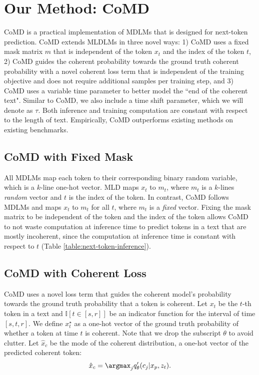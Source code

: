 \documentclass{article} %
\begin{document}
\section{Our Method: CoMD}

CoMD is a practical implementation of MDLMs that is designed for next-token prediction. CoMD extends MLDLMs in three novel ways: 1) CoMD uses a fixed mask matrix $m$ that is independent of the token $x_t$ and the index of the token $t$, 2) CoMD guides the coherent probability towards the ground truth coherent probability with a novel coherent loss term that is independent of the training objective and does not require additional samples per training step, and 3) CoMD uses a variable time parameter to better model the ``end of the coherent text". Similar to CoMD, we also include a time shift parameter, which we will denote as $\tau$. Both inference and training computation are constant with respect to the length of text. Empirically, CoMD outperforms existing methods on existing benchmarks.

\subsection{CoMD with Fixed Mask}
All MDLMs map each token to their corresponding binary random variable, which is a $k$-line one-hot vector. MLD maps $x_t$ to $m_t$, where $m_t$ is a $k$-lines \textit{random} vector and $t$ is the index of the token. In contrast, CoMD follows MDLMs and maps $x_t$ to $m_t$ for all $t$, where $m_t$ is a \textit{fixed} vector. Fixing the mask matrix to be independent of the token and the index of the token allows CoMD to not waste computation at inference time to predict tokens in a text that are mostly incoherent, since the computation at inference time is constant with respect to $t$ (Table \ref{table:next-token-inference}).


\subsection{CoMD with Coherent Loss}
\label{sec:coherent_loss}
CoMD uses a novel loss term that guides the coherent model's probability towards the ground truth probability that a token is coherent. Let $x_t$ be the $t$-th token in a text and $\mathbb I[t \in [s,r]]$ be an indicator function for the interval of time $[s,t,r]$. We define $ x_t^\star$ as a one-hot vector of the ground truth probability of whether a token at time $t$ is coherent. Note that we drop the subscript $\theta$ to avoid clutter. Let $\hat{x}_c$ be the mode of the coherent distribution, a one-hot vector of the predicted coherent token: 
\begin{align}
    \hat x_c = \argmax_{j} q^\prime_\theta(c_j | x_p, z_t).
\end{align}
\end{document}

